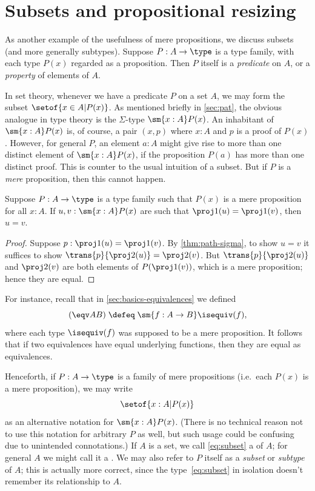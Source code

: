 %
%

\section{Subsets and propositional resizing}
\label{subsec:prop-subsets}

%

As another example of the usefulness of mere propositions, we discuss subsets (and more generally subtypes).
Suppose $P:A\to\type$ is a type family, with each type $P(x)$ regarded as a proposition.
Then $P$ itself is a \emph{predicate} on $A$, or a \emph{property} of elements of $A$.

In set theory, whenever we have a predicate $P$ on a set $A$, we may form the subset $\setof{x\in A | P(x)}$.
As mentioned briefly in \cref{sec:pat}, the obvious analogue in type theory is the $\Sigma$-type $\sm{x:A} P(x)$.
An inhabitant of $\sm{x:A} P(x)$ is, of course, a pair $(x,p)$ where $x:A$ and $p$ is a proof of $P(x)$.
However, for general $P$, an element $a:A$ might give rise to more than one distinct element of $\sm{x:A} P(x)$, if the proposition $P(a)$ has more than one distinct proof.
This is counter to the usual intuition of a subset.
But if $P$ is a \emph{mere} proposition, then this cannot happen.

\begin{lem}\label{thm:path-subset}
  Suppose $P:A\to\type$ is a type family such that $P(x)$ is a mere proposition for all $x:A$.
  If $u,v:\sm{x:A} P(x)$ are such that $\proj1(u) = \proj1(v)$, then $u=v$.
\end{lem}
\begin{proof}
  Suppose $p:\proj1(u) = \proj1(v)$.
  By \cref{thm:path-sigma}, to show $u=v$ it suffices to show $\trans{p}{\proj2(u)} = \proj2(v)$.
  But $\trans{p}{\proj2(u)}$ and $\proj2(v)$ are both elements of $P(\proj1(v))$, which is a mere proposition; hence they are equal.
\end{proof}

For instance, recall that in \cref{sec:basics-equivalences} we defined
\[(\eqv A B) \;\defeq\; \sm{f:A\to B} \isequiv (f),\]
where each type $\isequiv (f)$ was supposed to be a mere proposition.
It follows that if two equivalences have equal underlying functions, then they are equal as equivalences.

\label{defn:setof}%
Henceforth, if $P:A\to \type$ is a family of mere propositions (i.e.\ each $P(x)$ is a mere proposition), we may write
%
\begin{equation}
  \label{eq:subset}
  \setof{x:A | P(x)}
\end{equation}
%
as an alternative notation for $\sm{x:A} P(x)$.
(There is no technical reason not to use this notation for arbitrary $P$ as well, but such usage could be confusing due to unintended connotations.)
If $A$ is a set, we call \eqref{eq:subset} a 
%
%
of $A$; for general $A$ we might call it a .
%
We may also refer to $P$ itself as a \emph{subset} or \emph{subtype} of $A$; this is actually more correct, since the type~\eqref{eq:subset} in isolation doesn't remember its relationship to $A$.

